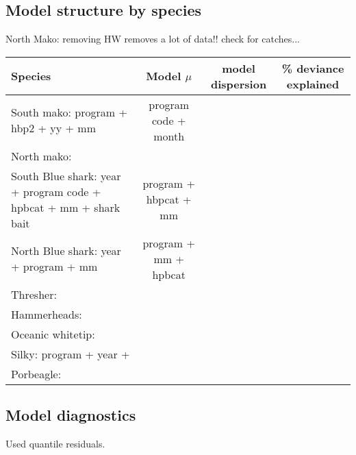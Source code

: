 \documentclass{SCreport}
\begin{document}
\subsection{Model structure by species}
North Mako: removing HW removes a lot of data!! check for catches... 
\begin{table}[!h]
\begin{center}
\begin{tabular}{l|ccc}
Species & Model $\mu$& model dispersion &\% deviance explained\\
\hline
\hline
South mako:  program + hbp2 + yy + mm & program code + month \\
North mako: \\
South Blue shark: year + program code + hpbcat + mm + shark bait & program + hbpcat + mm\\
North Blue shark: year + program + mm & program + mm + hpbcat\\
Thresher: \\
Hammerheads: \\
Oceanic whitetip: \\
Silky: program + year + \\
Porbeagle: \\ 

\end{tabular}
\end{center}
\end{table}
\subsection{Model diagnostics}
Used quantile residuals. 


\BSHnorthaic
\BSHsouthaic
\FALaic
\HHDaic
\MAKnorthaic
\MAKsouthaic
\OCSaic
\PORaic
\THRaic
\end{document}

